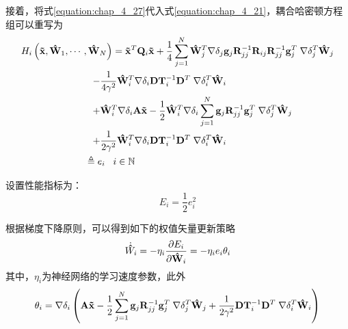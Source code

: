 接着，将式\ref{equation:chap_4_27}代入式\ref{equation:chap_4_21}，耦合哈密顿方程组可以重写为
\begin{equation}
  \begin{gathered}
    {H_i}\left( {{\mathbf{\tilde x}},{{{\mathbf{\hat W}}}_1}, \cdots ,{{{\mathbf{\hat W}}}_N}} \right) = {{{\mathbf{\tilde x}}}^T}{{\mathbf{Q}}_i}{\mathbf{\tilde x}} + \frac{1}{4}\sum\limits_{j = 1}^N {{\mathbf{\hat W}}_j^T\nabla {{\mathbf{\delta }}_j}{{\mathbf{g}}_j}{\mathbf{R}}_{jj}^{ - 1}{{\mathbf{R}}_{ij}}{\mathbf{R}}_{jj}^{ - 1}{\mathbf{g}}_j^T\;\nabla {\mathbf{\delta }}_j^T{{{\mathbf{\hat W}}}_j}}  \hfill \\
    \;\;\;\;\;\;\;\;\;\;\;\;\;\;\;\;\;\;\;\;\;\;\;\;\;\;\; - \frac{1}{{4{\gamma ^2}}}{\mathbf{\hat W}}_i^T\nabla {{\mathbf{\delta }}_i}{\mathbf{DT}}_i^{ - 1}{{\mathbf{D}}^T}\;\nabla {\mathbf{\delta }}_i^T{{{\mathbf{\hat W}}}_i}\; \hfill \\
    \;\;\;\;\;\;\;\;\;\;\;\;\;\;\;\;\;\;\;\;\;\;\;\;\;\;\; + {\mathbf{\hat W}}_i^T\nabla {{\mathbf{\delta }}_i}{\mathbf{A\tilde x}} - \frac{1}{2}{\mathbf{\hat W}}_i^T\nabla {{\mathbf{\delta }}_i}\sum\limits_{j = 1}^N {{{\mathbf{g}}_j}{\mathbf{R}}_{jj}^{ - 1}{\mathbf{g}}_j^T\;\nabla {\mathbf{\delta }}_j^T{{{\mathbf{\hat W}}}_j}}  \hfill \\
    \;\;\;\;\;\;\;\;\;\;\;\;\;\;\;\;\;\;\;\;\;\;\;\;\;\;\; + \frac{1}{{2{\gamma ^2}}}{\mathbf{\hat W}}_i^T\nabla {{\mathbf{\delta }}_i}{\mathbf{DT}}_i^{ - 1}{{\mathbf{D}}^T}\;\nabla {\mathbf{\delta }}_i^T{{{\mathbf{\hat W}}}_i}\;\; \hfill \\
    \;\;\;\;\;\;\;\;\;\;\;\;\;\;\;\;\;\;\;\;\;\;\;\;\; \triangleq {e_i}\;\;\;i \in \mathbb{N} \hfill \\ 
  \end{gathered} 
\end{equation}

设置性能指标为：
\begin{equation}
  {E_i} = \frac{1}{2}e_i^2
\end{equation}

根据梯度下降原则，可以得到如下的权值矢量更新策略
\begin{equation}
  {\dot{\bf{\hat W}}_i} =  - {\eta _i}\frac{{\partial {E_i}}}{{\partial {{{\bf{\hat W}}}_i}}} =  - {\eta _i}{e_i}{{\bf{\theta }}_i}
  \label{equation:chap_4_30}
\end{equation}
其中，${\eta _i}$为神经网络的学习速度参数，此外
\begin{equation}
  {{\bf{\theta }}_i} = \nabla {{\bf{\delta }}_i}\left( {{\bf{A\tilde x}} - \frac{1}{2}\sum\limits_{j = 1}^N {{{\bf{g}}_j}{\bf{R}}_{jj}^{ - 1}{\bf{g}}_j^T\;\nabla {\bf{\delta }}_j^T{{{\bf{\hat W}}}_j} + \frac{1}{{2{\gamma ^2}}}{\bf{DT}}_i^{ - 1}{{\bf{D}}^T}\;\nabla {\bf{\delta }}_i^T{{{\bf{\hat W}}}_i}} } \right)
\end{equation}

